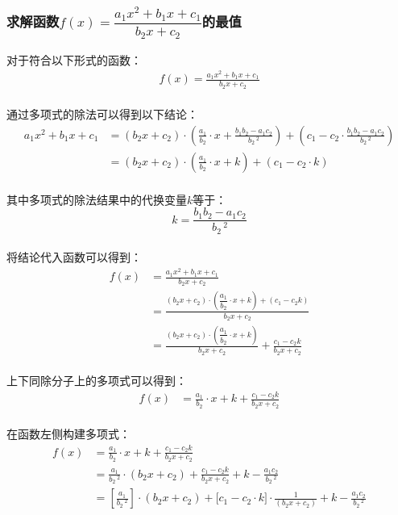 \documentclass[UTF8]{ctexart}
\begin{document}
\subsubsection{求解函数$f(x)=\dfrac{a_1x^2+b_1x+c_1}{b_2x+c_2}$的最值}
    对于符合以下形式的函数：
    \setcounter{equation}{0}
    \begin{align}
        f(x)=\frac{a_1x^2+b_1x+c_1}{b_2x+c_2}
    \end{align}\\
    通过多项式的除法可以得到以下结论：\vspace{3pt}
    \begin{align}
        a_1x^2+b_1x+c_1
        &=\left(b_2x+c_2\right)\cdot\left(\frac{a_1}{b_2}\cdot x+\frac{b_1b_2-a_1c_2}{b_2\,^2}\right)+\left(c_1-c_2\cdot\frac{b_1b_2-a_1c_2}{b_2\,^2}\right)\\[4mm]
        &=\left(b_2x+c_2\right)\cdot\left(\frac{a_1}{b_2}\cdot x+k\right)+\left(c_1-c_2\cdot k\right)
    \end{align}\\
    其中多项式的除法结果中的代换变量$k$等于：
    \begin{equation}
        k=\frac{b_1b_2-a_1c_2}{b_2\,^2}
    \end{equation}\\
    将结论代入函数可以得到：
    \begin{align}
        f(x)
        &=\frac{a_1x^2+b_1x+c_1}{b_2x+c_2}\\[4mm]
        &=\frac{\left(b_2x+c_2\right)\cdot\left(\dfrac{a_1}{b_2}\cdot x+k\right)+\left(c_1-c_2k\right)}{b_2x+c_2}\\[4mm]
        &=\frac{\left(b_2x+c_2\right)\cdot\left(\dfrac{a_1}{b_2}\cdot x+k\right)}{b_2x+c_2}+\frac{c_1-c_2k}{b_2x+c_2}
    \end{align}\\
    上下同除分子上的多项式可以得到：
    \begin{align}
        f(x)&=\frac{a_1}{b_2}\cdot x+k+\frac{c_1-c_2k}{b_2x+c_2}
    \end{align}\\
    在函数左侧构建多项式：
    \begin{align}
        f(x)
        &=\frac{a_1}{b_2}\cdot x+k+\frac{c_1-c_2k}{b_2x+c_2}\\[5mm]
        &=\frac{a_1}{b_2\,^2}\cdot(b_2x+c_2)+\frac{c_1-c_2k}{b_2x+c_2}+k-\frac{a_1c_2}{b_2\,^2}\\[5mm]
        &=\left[\frac{a_1}{b_2\,^2}\right]\cdot(b_2x+c_2)+\big[c_1-c_2\cdot k\big]\cdot\frac{1}{(b_2x+c_2)}+k-\frac{a_1c_2}{b_2\,^2}
    \end{align}
\end{document}
